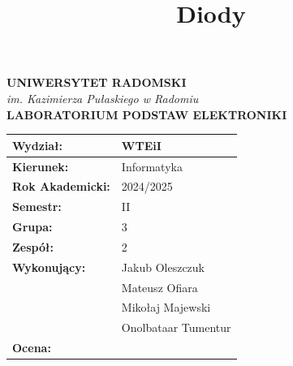 \documentclass[10pt]{article}
\title{Diody}
\date{}
\begin{document}
\thispagestyle{empty} %

\begin{center}
    {\Large\textbf{UNIWERSYTET RADOMSKI}} \\
    \textit{im. Kazimierza Pułaskiego w Radomiu} \\
    \vspace{0.3cm}
    {\large\textbf{LABORATORIUM PODSTAW ELEKTRONIKI}} \\
\end{center}

\vspace{1.5cm}

\begin{center}
\end{center}

\vspace{1.5cm}

\begin{center}
\begin{tabular}{|>{\bfseries}p{4cm}|p{6cm}|}
\hline
Wydział: & WTEiI \\
\hline
Kierunek: & Informatyka \\
\hline
Rok Akademicki: & 2024/2025 \\
\hline
Semestr: & II \\
\hline
Grupa: & 3 \\
\hline
Zespół: & 2 \\
\hline
Wykonujący: & Jakub Oleszczuk \\
& Mateusz Ofiara \\
& Mikołaj Majewski \\
& Onolbataar Tumentur \\
\hline
Ocena: &  \\
\hline
\end{tabular}
\end{center}

\vspace{2cm}
\end{document}
